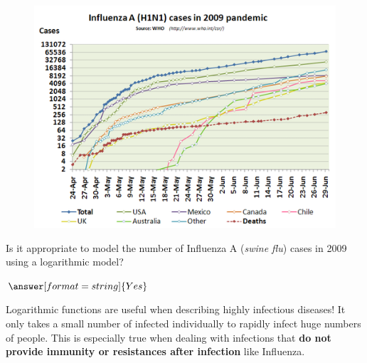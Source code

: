\documentclass{ximera}
\begin{document}
\begin{question}
\begin{figure}
	\includegraphics[scale=1]{Influenza-2009.png}
\end{figure}

Is it appropriate to model the number of Influenza A (\textit{swine flu}) cases in 2009 using a logarithmic model? 

$\answer[format=string]{Yes}$

\begin{feedback}
Logarithmic functions are useful when describing highly infectious diseases! It only takes a small number of infected individually to rapidly infect huge numbers of people. This is especially true when dealing with infections that \textbf{do not provide immunity or resistances after infection} like Influenza. 
\end{feedback}

\end{question}
\end{document}
